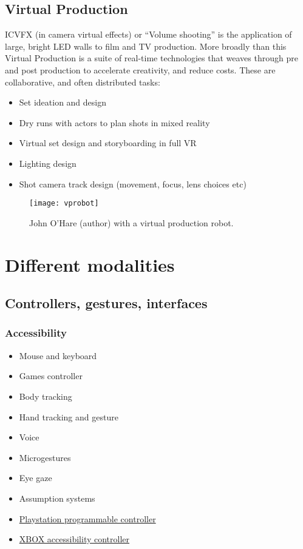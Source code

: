 \subsection{Virtual Production}

ICVFX (in camera virtual effects) or ``Volume shooting'' is the application of large, bright LED walls to film and TV production. More broadly than this Virtual Production is a suite of real-time technologies that weaves through pre and post production to accelerate creativity, and reduce costs.
These are collaborative, and often distributed tasks:
\begin{itemize}
\item Set ideation and design
\item Dry runs with actors to plan shots in mixed reality
\item Virtual set design and storyboarding in full VR
\item Lighting design
\item Shot camera track design (movement, focus, lens choices etc)
\end{itemize}
\begin{figure}[ht]
  \centering
    \texttt{[image: vprobot]}
  \caption{John O'Hare (author) with a virtual production robot.}
  \label{fig:vprobot}
\end{figure}
\section{Different modalities}
\subsection{Controllers, gestures, interfaces}
\subsubsection{Accessibility}
\begin{itemize}
\item Mouse and keyboard
\item Games controller
\item Body tracking
\item Hand tracking and gesture
\item Voice
\item Microgestures
\item Eye gaze
\item Assumption systems
\item \href{https://blog.playstation.com/2023/01/04/introducing-project-leonardo-for-playstation-5-a-highly-customizable-accessibility-controller-kit/}{Playstation programmable controller}
\item \href{https://www.xbox.com/en-GB/accessories/controllers/xbox-adaptive-controller}{XBOX accessibility controller}
\end{itemize}
